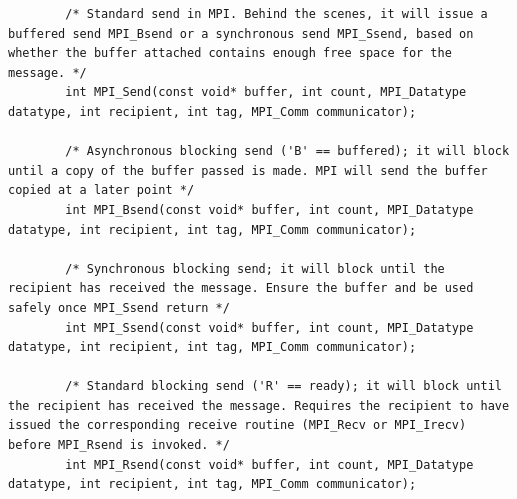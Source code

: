 \documentclass[11pt,a4paper]{article}
\begin{document}
	\newpage
	\begin{lstlisting}
		/* Standard send in MPI. Behind the scenes, it will issue a buffered send MPI_Bsend or a synchronous send MPI_Ssend, based on whether the buffer attached contains enough free space for the message. */
		int MPI_Send(const void* buffer, int count, MPI_Datatype datatype, int recipient, int tag, MPI_Comm communicator);
		
		/* Asynchronous blocking send ('B' == buffered); it will block until a copy of the buffer passed is made. MPI will send the buffer copied at a later point */ 
		int MPI_Bsend(const void* buffer, int count, MPI_Datatype datatype, int recipient, int tag, MPI_Comm communicator);
		
		/* Synchronous blocking send; it will block until the recipient has received the message. Ensure the buffer and be used safely once MPI_Ssend return */
		int MPI_Ssend(const void* buffer, int count, MPI_Datatype datatype, int recipient, int tag, MPI_Comm communicator);
		
		/* Standard blocking send ('R' == ready); it will block until the recipient has received the message. Requires the recipient to have issued the corresponding receive routine (MPI_Recv or MPI_Irecv) before MPI_Rsend is invoked. */
		int MPI_Rsend(const void* buffer, int count, MPI_Datatype datatype, int recipient, int tag, MPI_Comm communicator);
		
	\end{lstlisting}
	
	
	
	\label{sec:background}
\end{document}
